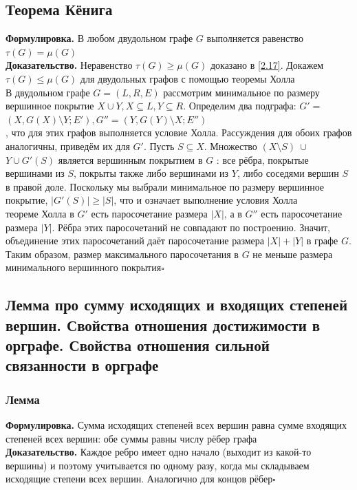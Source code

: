 \documentclass[a4paper]{article}
\newcommand{\qed}{\hfill$\square$}
\begin{document}
\subsection{Теорема Кёнига}
\textbf{Формулировка.} В любом двудольном графе $G$ выполняется равенство $\tau(G) = \mu(G)$\\[2mm]
\indent\textbf{Доказательство.} Неравенство  $\tau(G)\geqslant\mu(G)$ доказано в \ref{2.17}. Докажем  $\tau(G)\leqslant\mu(G)$ для двудольных графов с помощью теоремы Холла\\
\indent В двудольном графе $G=(L, R, E)$ рассмотрим минимальное по размеру вершинное покрытие $X \cup Y, X \subseteq L, Y \subseteq R$. Определим два подграфа: $G'=$ $\left(X, G(X) \setminus Y ; E'\right), G''=\left(Y, G(Y) \setminus X ; E''\right)$\\[2mm]
, что для этих графов выполняется условие Холла. Рассуждения для обоих графов аналогичны, приведём их для $G'$. Пусть $S \subseteq X$. Множество $(X \setminus S)\ \cup$ $Y \cup G'(S)$ является вершинным покрытием в $G$ : все рёбра, покрытые вершинами из $S$, покрыты также либо вершинами из $Y$, либо соседями вершин $S$ в правой доле. Поскольку мы выбрали минимальное по размеру вершинное покрытие, $\left|G'(S)\right| \geqslant|S|$, что и означает выполнение условия Холла\\[2mm]
 теореме Холла в $G'$ есть паросочетание размера $|X|$, а в $G''$ есть паросочетание размера $|Y|$. Рёбра этих паросочетаний не совпадают по построению. Значит, объединение этих паросочетаний даёт паросочетание размера $|X|+|Y|$ в графе $G$. Таким образом, размер максимального паросочетания в $G$ не меньше размера минимального вершинного покрытия\qed


\subsection{Лемма про сумму исходящих и входящих степеней вершин. Свойства отношения достижимости в орграфе. Свойства отношения сильной связанности в орграфе}
\subsubsection*{Лемма}
\textbf{Формулировка.} Сумма исходящих степеней всех вершин равна сумме входящих степеней всех вершин: обе суммы равны числу рёбер графа\\[2mm]
\indent\textbf{Доказательство.} Каждое ребро имеет одно начало (выходит из какой-то вершины) и поэтому учитывается по одному разу, когда мы складываем исходящие степени всех вершин. Аналогично для концов рёбер\qed
\end{document}
